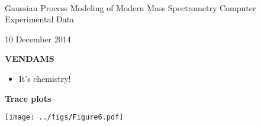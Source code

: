 \documentclass[mathserif, 11pt, t]{beamer}
\renewcommand{\subtitle}[1]{\vspace{0.45cm}\textcolor{bluegreen}{
    {\textbf{#1}}}\vspace{0.15cm}\newline}
\begin{document}
\begin{center}
\ \\ [-0.5in]
\vfill
\bigskip
\bigskip
\bigskip
\bigskip
\bigskip

\begin{LARGE}
\begin{center}
Gaussian Process Modeling of Modern Mass Spectrometry Computer Experimental Data
\end{center}
\end{LARGE}
\vfill
{}
\vfill
10 December 2014
\bigskip
\bigskip
\bigskip
\vfill
\ \\ [-0.5in]
\end{center}

\begin{frame}
\subtitle{VENDAMS}
\begin{itemize}[label={$\cdot$}]
\item It's chemistry!
\end{itemize}
\end{frame}

\begin{frame}
\subtitle{Trace plots}
\begin{center}
\texttt{[image: ../figs/Figure6.pdf]}
\end{center}
\end{frame}
\end{document}
